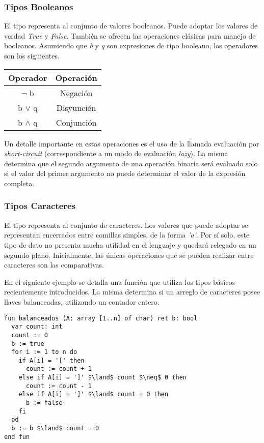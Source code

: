 \documentclass{article}
\begin{document}
\subsubsection{Tipos Booleanos}

El tipo  representa al conjunto de valores booleanos.
Puede adoptar los valores de verdad \textit{True} y \textit{False}.
También se ofrecen las operaciones clásicas para manejo de booleanos.
Asumiendo que \textit{b} y \textit{q} son expresiones de tipo booleano, los operadores son los siguientes.

\begin{center}
\begin{tabular}{| c | c |}
\hline
     Operador & Operación \\
     \hline
     $\neg$ b & Negación \\
     b $\lor$ q & Disyunción \\
     b $\land$ q & Conjunción \\
\hline
\end{tabular}
\end{center}

Un detalle importante en estas operaciones es el uso de la llamada evaluación por \textit{short-circuit} (correspondiente a un modo de evaluación \textit{lazy}).
La misma determina que el segundo argumento de una operación binaria será evaluado solo si el valor del primer argumento no puede determinar el valor de la expresión completa.

\subsubsection{Tipos Caracteres}

El tipo  representa al conjunto de caracteres.
Los valores que puede adoptar se representan encerrados entre comillas simples, de la forma \textit{'a'}.
Por sí solo, este tipo de dato no presenta mucha utilidad en el lenguaje y quedará relegado en un segundo plano.
Inicialmente, las únicas operaciones que se pueden realizar entre caracteres son las comparativas.

En el siguiente ejemplo se detalla una función que utiliza los tipos básicos recientemente introducidos.
La misma determina si un arreglo de caracteres posee llaves balanceadas, utilizando un contador entero.

\begin{lstlisting}
fun balanceados (A: array [1..n] of char) ret b: bool
  var count: int
  count := 0
  b := true
  for i := 1 to n do
    if A[i] = '[' then
      count := count + 1
    else if A[i] = ']' $\land$ count $\neq$ 0 then
      count := count - 1
    else if A[i] = ']' $\land$ count = 0 then
      b := false
    fi
  od
  b := b $\land$ count = 0
end fun
\end{lstlisting}
\end{document}

